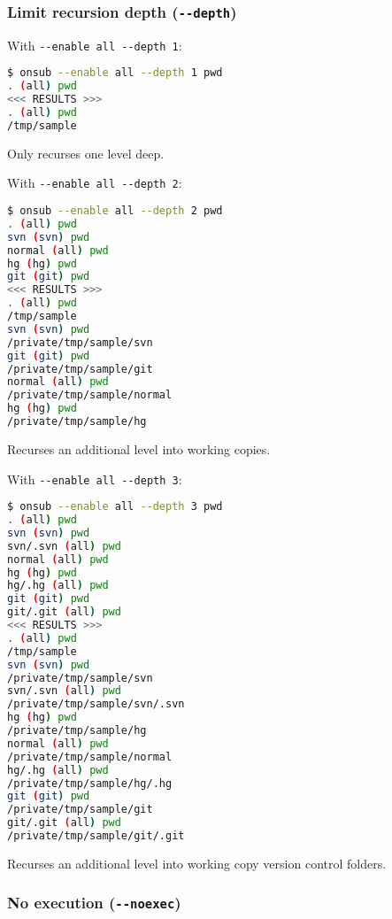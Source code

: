 \subsubsection*{Limit recursion depth (\lstinline{--depth})}

With \lstinline{--enable all --depth 1}:

\begin{snugshade}
\begin{lstlisting}[language=bash]	
$ onsub --enable all --depth 1 pwd
. (all) pwd
<<< RESULTS >>>
. (all) pwd
/tmp/sample
\end{lstlisting}
\end{snugshade}

Only recurses one level deep.

With \lstinline{--enable all --depth 2}:

\begin{snugshade}
\begin{lstlisting}[language=bash]	
$ onsub --enable all --depth 2 pwd
. (all) pwd
svn (svn) pwd
normal (all) pwd
hg (hg) pwd
git (git) pwd
<<< RESULTS >>>
. (all) pwd
/tmp/sample
svn (svn) pwd
/private/tmp/sample/svn
git (git) pwd
/private/tmp/sample/git
normal (all) pwd
/private/tmp/sample/normal
hg (hg) pwd
/private/tmp/sample/hg
\end{lstlisting}
\end{snugshade}

Recurses an additional level into working copies.

With \lstinline{--enable all --depth 3}:

\begin{snugshade}
\begin{lstlisting}[language=bash]	
$ onsub --enable all --depth 3 pwd
. (all) pwd
svn (svn) pwd
svn/.svn (all) pwd
normal (all) pwd
hg (hg) pwd
hg/.hg (all) pwd
git (git) pwd
git/.git (all) pwd
<<< RESULTS >>>
. (all) pwd
/tmp/sample
svn (svn) pwd
/private/tmp/sample/svn
svn/.svn (all) pwd
/private/tmp/sample/svn/.svn
hg (hg) pwd
/private/tmp/sample/hg
normal (all) pwd
/private/tmp/sample/normal
hg/.hg (all) pwd
/private/tmp/sample/hg/.hg
git (git) pwd
/private/tmp/sample/git
git/.git (all) pwd
/private/tmp/sample/git/.git
\end{lstlisting}
\end{snugshade}

Recurses an additional level into working copy version control folders.

\subsubsection*{No execution (\lstinline{--noexec})}

